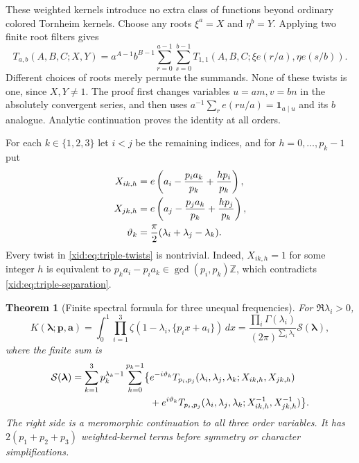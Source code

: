\documentclass[11pt,a4paper]{article}
\numberwithin{equation}{section}
\newtheorem{theorem}{Theorem}[section]
\theoremstyle{definition}
\theoremstyle{remark}
\begin{document}
These weighted kernels introduce no extra class of functions beyond
ordinary colored Tornheim kernels.  Choose any roots $\xi^a=X$ and
$\eta^b=Y$.  Applying two finite root filters gives
\begin{equation}\label{xid:eq:weighted-T-reduction}
 T_{a,b}(A,B,C;X,Y)
 =a^{A-1}b^{B-1}
 \sum_{r=0}^{a-1}\sum_{s=0}^{b-1}
 T_{1,1}(A,B,C;\xi e(r/a),\eta e(s/b)).
\end{equation}
Different choices of roots merely permute the summands.  None of
these twists is one, since $X,Y\ne1$.  The proof first changes
variables $u=am,v=bn$ in the absolutely convergent series, and then
uses $a^{-1}\sum_r e(ru/a)=\mathbf1_{a\mid u}$ and its $b$ analogue.
Analytic continuation proves the identity at all orders.

For each $k\in\{1,2,3\}$ let $i<j$ be the remaining indices, and
for $h=0,\ldots,p_k-1$ put
\begin{align}
 X_{ik,h}&=e\left(a_i-\frac{p_i a_k}{p_k}
                              +\frac{hp_i}{p_k}\right),\notag\\
 X_{jk,h}&=e\left(a_j-\frac{p_j a_k}{p_k}
                              +\frac{hp_j}{p_k}\right),\label{xid:eq:triple-twists}\\
 \vartheta_k&=\frac\pi2(\lambda_i+\lambda_j-\lambda_k).
 \notag
\end{align}
Every twist in \eqref{xid:eq:triple-twists} is nontrivial.  Indeed,
$X_{ik,h}=1$ for some integer $h$ is equivalent to
$p_k a_i-p_i a_k\in\gcd(p_i,p_k)\mathbb Z$, which contradicts
\eqref{xid:eq:triple-separation}.

\begin{theorem}[Finite spectral formula for three unequal frequencies]
\label{xid:thm:triple-spectral}
For $\Re\lambda_i>0$,
\begin{equation}\label{xid:eq:triple-K}
 K(\boldsymbol\lambda;\boldsymbol p,\boldsymbol a)
 =\int_0^1\prod_{i=1}^3
       \zeta(1-\lambda_i,\{p_i x+a_i\})\,dx
 =\frac{\prod_i\Gamma(\lambda_i)}{(2\pi)^{\sum_i\lambda_i}}
       \mathcal S(\boldsymbol\lambda),
\end{equation}
where the finite sum is
\begin{align}
 \mathcal S(\boldsymbol\lambda)
 =\sum_{k=1}^3p_k^{\lambda_k-1}\sum_{h=0}^{p_k-1}
 \bigl\{&e^{-i\vartheta_k}
 T_{p_i,p_j}(\lambda_i,\lambda_j,\lambda_k;
                         X_{ik,h},X_{jk,h})\notag\\
 &+e^{i\vartheta_k}
 T_{p_i,p_j}(\lambda_i,\lambda_j,\lambda_k;
                         X_{ik,h}^{-1},X_{jk,h}^{-1})\bigr\}.
 \label{xid:eq:triple-cones}
\end{align}
The right side is a meromorphic continuation to all three order
variables.  It has $2(p_1+p_2+p_3)$ weighted-kernel terms before
symmetry or character simplifications.
\end{theorem}
\end{document}
